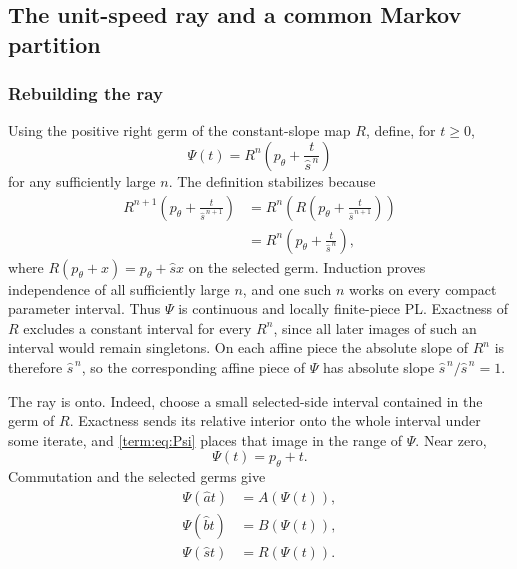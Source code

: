 \documentclass[11pt]{article}
\theoremstyle{definition}
\theoremstyle{remark}
\begin{document}
\subsection{The unit-speed ray and a common Markov partition}

\subsubsection{Rebuilding the ray}

Using the positive right germ of the constant-slope map \(R\), define, for
\(t\geq0\),
\begin{equation}\label{term:eq:Psi}
 \Psi(t)=R^n\left(p_\theta+\frac{t}{\widehat s^{\,n}}\right)
\end{equation}
for any sufficiently large \(n\).  The definition stabilizes because
\[
\begin{split}
 R^{n+1}\left(p_\theta+\frac{t}{\widehat s^{\,n+1}}\right)
 &=R^n\left(
     R\left(p_\theta+\frac{t}{\widehat s^{\,n+1}}\right)\right)\\
 &=R^n\left(p_\theta+\frac{t}{\widehat s^{\,n}}\right),
\end{split}
\]
where \(R(p_\theta+x)=p_\theta+\widehat s x\) on the selected germ.
Induction proves independence of all sufficiently large \(n\), and one such
\(n\) works on every compact parameter interval.  Thus \(\Psi\) is continuous
and locally finite-piece PL.  Exactness of \(R\) excludes a constant interval
for every \(R^n\), since all later images of such an interval would remain
singletons.  On each affine piece the absolute slope of \(R^n\) is therefore
\(\widehat s^{\,n}\), so the corresponding affine piece of \(\Psi\) has
absolute slope
\(\widehat s^{\,n}/\widehat s^{\,n}=1\).

The ray is onto.  Indeed, choose a small selected-side interval contained in
the germ of \(R\).  Exactness sends its relative interior onto the whole
interval under some iterate, and \eqref{term:eq:Psi} places that image in the
range of \(\Psi\).  Near zero,
\begin{equation}\label{term:eq:Psi-initial}
 \Psi(t)=p_\theta+t.
\end{equation}
Commutation and the selected germs give
\begin{equation}\label{term:eq:Psi-equivariance}
\begin{split}
 \Psi(\widehat a t)&=A(\Psi(t)),\\
 \Psi(\widehat b t)&=B(\Psi(t)),\\
 \Psi(\widehat s t)&=R(\Psi(t)).
\end{split}
\end{equation}
\end{document}
